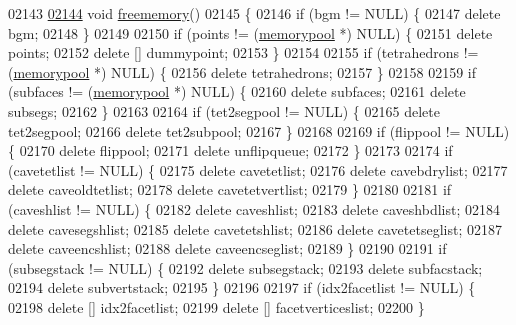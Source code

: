 \begin{DoxyCode}
02143 
\hypertarget{tetgen_8h_source.tex_l02144}{}\hyperlink{classtetgenmesh_ade805f03ec7ca1b4623c8148fb915278}{02144}   \textcolor{keywordtype}{void} \hyperlink{classtetgenmesh_ade805f03ec7ca1b4623c8148fb915278}{freememory}()
02145   \{
02146     \textcolor{keywordflow}{if} (bgm != NULL) \{
02147       \textcolor{keyword}{delete} bgm;
02148     \}
02149 
02150     \textcolor{keywordflow}{if} (points != (\hyperlink{classtetgenmesh_1_1memorypool}{memorypool} *) NULL) \{
02151       \textcolor{keyword}{delete} points;
02152       \textcolor{keyword}{delete} [] dummypoint;
02153     \}
02154 
02155     \textcolor{keywordflow}{if} (tetrahedrons != (\hyperlink{classtetgenmesh_1_1memorypool}{memorypool} *) NULL) \{
02156       \textcolor{keyword}{delete} tetrahedrons;
02157     \}
02158 
02159     \textcolor{keywordflow}{if} (subfaces != (\hyperlink{classtetgenmesh_1_1memorypool}{memorypool} *) NULL) \{
02160       \textcolor{keyword}{delete} subfaces;
02161       \textcolor{keyword}{delete} subsegs;
02162     \}
02163 
02164     \textcolor{keywordflow}{if} (tet2segpool != NULL) \{
02165       \textcolor{keyword}{delete} tet2segpool;
02166       \textcolor{keyword}{delete} tet2subpool;
02167     \}
02168 
02169     \textcolor{keywordflow}{if} (flippool != NULL) \{
02170       \textcolor{keyword}{delete} flippool;
02171       \textcolor{keyword}{delete} unflipqueue;
02172     \}
02173 
02174     \textcolor{keywordflow}{if} (cavetetlist != NULL) \{
02175       \textcolor{keyword}{delete} cavetetlist;
02176       \textcolor{keyword}{delete} cavebdrylist;
02177       \textcolor{keyword}{delete} caveoldtetlist;
02178       \textcolor{keyword}{delete} cavetetvertlist;
02179     \}
02180 
02181     \textcolor{keywordflow}{if} (caveshlist != NULL) \{
02182       \textcolor{keyword}{delete} caveshlist;
02183       \textcolor{keyword}{delete} caveshbdlist;
02184       \textcolor{keyword}{delete} cavesegshlist;
02185       \textcolor{keyword}{delete} cavetetshlist;
02186       \textcolor{keyword}{delete} cavetetseglist;
02187       \textcolor{keyword}{delete} caveencshlist;
02188       \textcolor{keyword}{delete} caveencseglist;
02189     \}
02190 
02191     \textcolor{keywordflow}{if} (subsegstack != NULL) \{
02192       \textcolor{keyword}{delete} subsegstack;
02193       \textcolor{keyword}{delete} subfacstack;
02194       \textcolor{keyword}{delete} subvertstack;
02195     \}
02196 
02197     \textcolor{keywordflow}{if} (idx2facetlist != NULL) \{
02198       \textcolor{keyword}{delete} [] idx2facetlist;
02199       \textcolor{keyword}{delete} [] facetverticeslist;
02200     \}

\end{DoxyCode}
